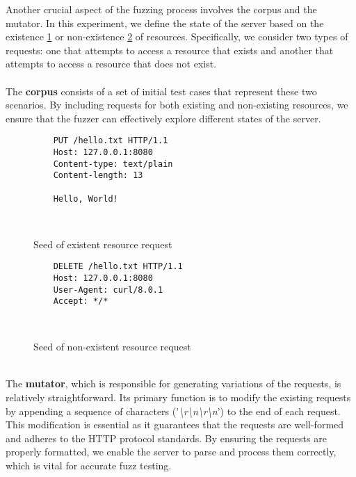 Another crucial aspect of the fuzzing process involves the corpus and the mutator. In this experiment, we define the state of the server based on the existence \ref{tab:existent_resource} or non-existence \ref{tab:nonexistent_resource} of resources. Specifically, we consider two types of requests: one that attempts to access a resource that exists and another that attempts to access a resource that does not exist.
\\\\The \textbf{corpus} consists of a set of initial test cases that represent these two scenarios. By including requests for both existing and non-existing resources, we ensure that the fuzzer can effectively explore different states of the server.
\begin{figure}[H]
    \centering
    \begin{adjustbox}{valign=t}
    \begin{lstlisting}
    PUT /hello.txt HTTP/1.1
    Host: 127.0.0.1:8080
    Content-type: text/plain
    Content-length: 13

    Hello, World!

    
    \end{lstlisting}
    \end{adjustbox}
    \caption{Seed of existent resource request}
    \label{tab:existent_resource}
\end{figure}
    
\begin{figure}[H]
    \centering
    \begin{adjustbox}{valign=t}
    \begin{lstlisting}
    DELETE /hello.txt HTTP/1.1
    Host: 127.0.0.1:8080
    User-Agent: curl/8.0.1
    Accept: */*

    
    \end{lstlisting}
    \end{adjustbox}
    \caption{Seed of non-existent resource request}
    \label{tab:nonexistent_resource}
\end{figure}
\phantom{}\\
The \textbf{mutator}, which is responsible for generating variations of the requests, is relatively straightforward. Its primary function is to modify the existing requests by appending a sequence of characters ('\textit{\textbackslash r\textbackslash n\textbackslash r\textbackslash n}') to the end of each request. This modification is essential as it guarantees that the requests are well-formed and adheres to the HTTP protocol standards. By ensuring the requests are properly formatted, we enable the server to parse and process them correctly, which is vital for accurate fuzz testing.

